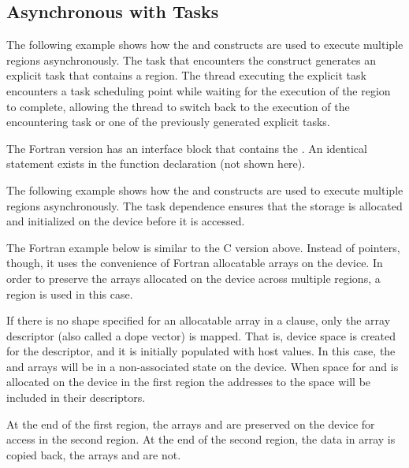 \subsection{Asynchronous  with Tasks}
\label{subsec:async_target_with_tasks}

The following example shows how the  and  constructs 
are used to execute multiple  regions asynchronously. The task that 
encounters the  construct generates an explicit task that contains 
a  region. The thread executing the explicit task encounters a task 
scheduling point while waiting for the execution of the  region 
to complete, allowing the thread to switch back to the execution of the encountering 
task or one of the previously generated explicit tasks.


\pagebreak
The Fortran version has an interface block that contains the  . 
An identical statement exists in the function declaration (not shown here).


The following example shows how the  and  constructs 
are used to execute multiple  regions asynchronously. The task dependence 
ensures that the storage is allocated and initialized on the device before it is 
accessed.


The Fortran example below is similar to the C version above. Instead of pointers, though, it uses
the convenience of Fortran allocatable arrays on the device. In order to preserve the arrays 
allocated on the device across multiple  regions, a ~ region 
is used in this case.

If there is no shape specified for an allocatable array in a  clause, only the array descriptor
(also called a dope vector) is mapped. That is, device space is created for the descriptor, and it
is initially populated with host values. In this case, the  and  arrays will be in a
non-associated state on the device. When space for  and  is allocated on the device
in the first  region the addresses to the space will be included in their descriptors.

At the end of the first  region, the arrays  and  are preserved on the device 
for access in the second  region. At the end of the second  region, the data 
in array  is copied back, the arrays  and  are not.

